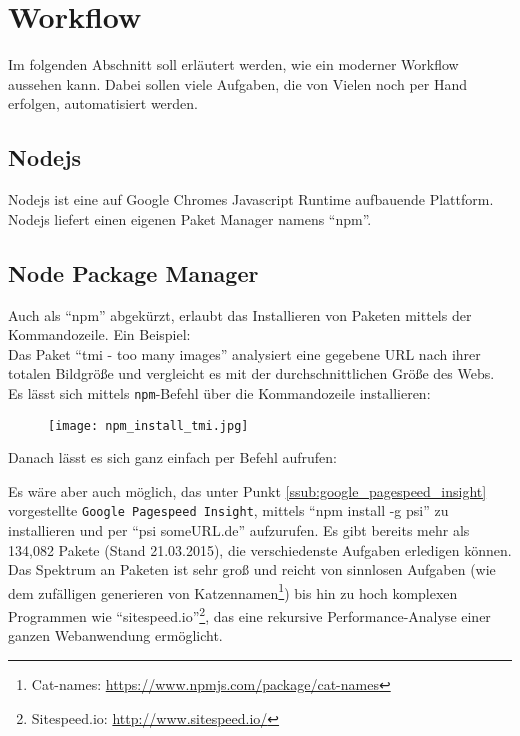 \section{Workflow} %
\label{sec:workflow}
	Im folgenden Abschnitt soll erläutert werden, wie ein moderner Workflow aussehen kann. Dabei sollen viele Aufgaben, die von Vielen noch per Hand erfolgen, automatisiert werden.\\

	\subsection{Nodejs} %
	\label{sub:nodejs}
		Nodejs ist eine auf Google Chromes Javascript Runtime aufbauende Plattform. Nodejs liefert einen eigenen Paket Manager namens "`npm"'.

	\subsection{Node Package Manager} %
	\label{sub:node_package_manager}
		Auch als "`npm"' abgekürzt, erlaubt das Installieren von Paketen mittels der Kommandozeile. Ein Beispiel:\\
		Das Paket "`tmi - too many images"' analysiert eine gegebene URL nach ihrer totalen Bildgröße und vergleicht es mit der durchschnittlichen Größe des Webs. Es lässt sich mittels \texttt{npm}-Befehl über die Kommandozeile installieren:
		\begin{figure}[htbp]
			\begin{center}
				\texttt{[image: npm\_install\_tmi.jpg]}
				\label{fig:npm_install_tmi}
			\end{center}
		\end{figure}
		Danach lässt es sich ganz einfach per Befehl aufrufen:

		Es wäre aber auch möglich, das unter Punkt \ref{ssub:google_pagespeed_insight} vorgestellte \texttt{Google Pagespeed Insight}, mittels "`npm install -g psi"' zu installieren und per "`psi someURL.de"' aufzurufen. Es gibt bereits mehr als 134,082 Pakete (Stand 21.03.2015), die verschiedenste Aufgaben erledigen können. Das Spektrum an Paketen ist sehr groß und reicht von sinnlosen Aufgaben (wie dem zufälligen generieren von Katzennamen\footnote{Cat-names: \url{https://www.npmjs.com/package/cat-names}}) bis hin zu hoch komplexen Programmen wie "`sitespeed.io"'\footnote{Sitespeed.io: \url{http://www.sitespeed.io/}}, das eine rekursive Performance-Analyse einer ganzen Webanwendung ermöglicht.\\

